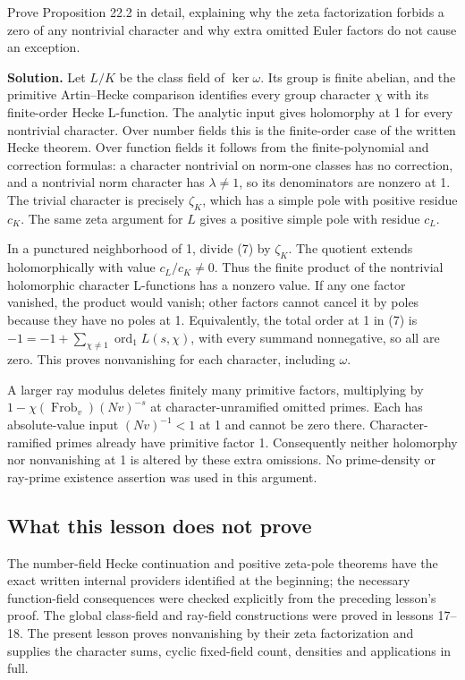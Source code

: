 \documentclass[11pt,a4paper]{article}
\begin{document}
Prove Proposition 22.2 in detail, explaining why the zeta factorization
forbids a zero of any nontrivial character and why extra omitted Euler
factors do not cause an exception.

\textbf{Solution.} Let \(L/K\) be the class field of \(\ker\omega\). Its
group is finite abelian, and the primitive Artin--Hecke comparison
identifies every group character \(\chi\) with its finite-order Hecke
L-function. The analytic input gives holomorphy at 1 for every
nontrivial character. Over number fields this is the finite-order case
of the written Hecke theorem. Over function fields it follows from the
finite-polynomial and correction formulas: a character nontrivial on
norm-one classes has no correction, and a nontrivial norm character has
\(\lambda\ne1\), so its denominators are nonzero at 1. The trivial
character is precisely \(\zeta_K\), which has a simple pole with
positive residue \(c_K\). The same zeta argument for \(L\) gives a
positive simple pole with residue \(c_L\).

In a punctured neighborhood of 1, divide (7) by \(\zeta_K\). The
quotient extends holomorphically with value \(c_L/c_K\ne0\). Thus the
finite product of the nontrivial holomorphic character L-functions has a
nonzero value. If any one factor vanished, the product would vanish;
other factors cannot cancel it by poles because they have no poles at 1.
Equivalently, the total order at 1 in (7) is
\(-1=-1+\sum_{\chi\ne1}\operatorname{ord}_1L(s,\chi)\), with every
summand nonnegative, so all are zero. This proves nonvanishing for each
character, including \(\omega\).

A larger ray modulus deletes finitely many primitive factors,
multiplying by \(1-\chi(\operatorname{Frob}_v)(Nv)^{-s}\) at
character-unramified omitted primes. Each has absolute-value input
\((Nv)^{-1}<1\) at 1 and cannot be zero there. Character-ramified primes
already have primitive factor 1. Consequently neither holomorphy nor
nonvanishing at 1 is altered by these extra omissions. No prime-density
or ray-prime existence assertion was used in this argument.

\subsection{What this lesson does not
prove}\label{what-this-lesson-does-not-prove}

The number-field Hecke continuation and positive zeta-pole theorems have
the exact written internal providers identified at the beginning; the
necessary function-field consequences were checked explicitly from the
preceding lesson's proof. The global class-field and ray-field
constructions were proved in lessons 17--18. The present lesson proves
nonvanishing by their zeta factorization and supplies the character
sums, cyclic fixed-field count, densities and applications in full.
\end{document}
